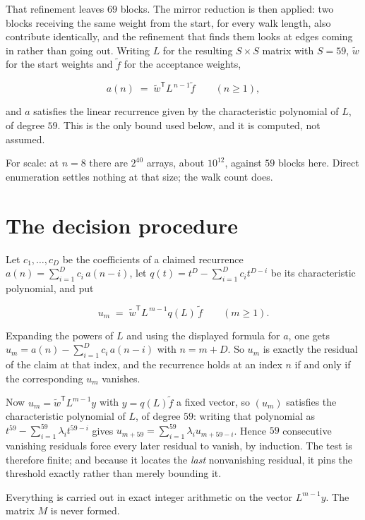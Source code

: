 \documentclass[11pt]{article}
\theoremstyle{definition}
\begin{document}
That refinement leaves $69$ blocks. The mirror reduction is then applied: two blocks receiving the same weight from the start, for every walk length, also contribute identically, and the refinement that finds them looks at edges coming in rather than going out. Writing $L$ for the resulting $S \times S$ matrix with $S = 59$, $\tilde w$ for the start weights and $\tilde f$ for the acceptance weights,

\[a(n) \;=\; \tilde w^{\mathsf T} L^{\,n-1} \tilde f \qquad (n \ge 1),\]

and $a$ satisfies the linear recurrence given by the characteristic polynomial of $L$, of degree $59$. This is the only bound used below, and it is computed, not assumed.

For scale: at $n = 8$ there are $2^{40}$ arrays, about $10^{12}$, against $59$ blocks here. Direct enumeration settles nothing at that size; the walk count does.

\section{The decision procedure}

Let $c_1,\dots,c_D$ be the coefficients of a claimed recurrence $a(n) = \sum_{i=1}^{D} c_i\,a(n-i)$, let $q(t) = t^{D} - \sum_{i=1}^{D} c_i t^{D-i}$ be its characteristic polynomial, and put

\[u_m \;=\; \tilde w^{\mathsf T} L^{\,m-1} q(L)\,\tilde f \qquad (m \ge 1).\]

Expanding the powers of $L$ and using the displayed formula for $a$, one gets $u_m = a(n) - \sum_{i=1}^{D} c_i\,a(n-i)$ with $n = m + D$. So $u_m$ is exactly the residual of the claim at that index, and the recurrence holds at an index $n$ if and only if the corresponding $u_m$ vanishes.

Now $u_m = \tilde w^{\mathsf T} L^{m-1} y$ with $y = q(L)\tilde f$ a fixed vector, so $(u_m)$ satisfies the characteristic polynomial of $L$, of degree $59$: writing that polynomial as $t^{59} - \sum_{i=1}^{59} \lambda_i t^{59-i}$ gives $u_{m+59} = \sum_{i=1}^{59} \lambda_i u_{m+59-i}$. Hence $59$ consecutive vanishing residuals force every later residual to vanish, by induction. The test is therefore finite; and because it locates the {\itshape last} nonvanishing residual, it pins the threshold exactly rather than merely bounding it.

Everything is carried out in exact integer arithmetic on the vector $L^{m-1}y$. The matrix $M$ is never formed.
\end{document}
